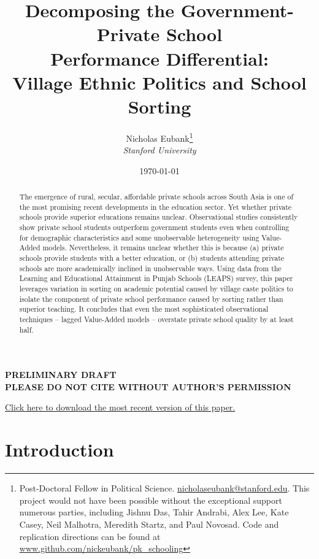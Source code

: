 \documentclass[11pt]{article}
\title{Decomposing the Government-Private School \\ Performance Differential: \\ Village Ethnic Politics and School Sorting}
\author{Nicholas Eubank\footnote{Post-Doctoral Fellow in Political Science. \href{mailto:nicholaseubank@stanford.edu}{nicholaseubank@stanford.edu}. This project would not have been possible without the exceptional support numerous parties, including Jishnu Das, Tahir Andrabi, Alex Lee, Kate Casey, Neil Malhotra, Meredith Startz, and Paul Novosad.  Code and replication directions can be found at \href{http://www.github.com/nickeubank/pk_schooling}{\url{www.github.com/nickeubank/pk_schooling}}} \\ \emph{Stanford University}}
\date{\today}
\begin{document}
\maketitle
\begin{center}
\vspace{1.5cm}

\textbf{PRELIMINARY DRAFT \\ PLEASE DO NOT CITE WITHOUT AUTHOR’S PERMISSION}

{\Large \color{blue}\href{http://www.nickeubank.com/eubank_schoolsorting/}{Click here to download the most recent version of this paper.}\color{black}}
\vspace{1.5cm}\\

\end{center}

\vspace{0.5cm}

\begin{abstract}
The emergence of rural, secular, affordable private schools across South Asia is one of the most promising recent developments in the education sector. Yet whether private schools provide superior educations remains unclear. Observational studies consistently show private school students outperform government students even when controlling for demographic characteristics and some unobservable heterogeneity using Value-Added models. Nevertheless, it remains unclear whether this is because (a) private schools provide students with a better education, or (b) students attending private schools are more academically inclined in unobservable ways. Using data from the Learning and Educational Attainment in Punjab Schools (LEAPS) survey, this paper leverages variation in sorting on academic potential caused by village caste politics to isolate the component of private school performance caused by sorting rather than superior teaching. It concludes that even the most sophisticated observational techniques -- lagged Value-Added models -- overstate private school quality by at least half. 
\end{abstract}

\thispagestyle{empty}



\pagebreak

\setcounter{page}{1}

\section{Introduction}\label{pk_intro}
\end{document}
